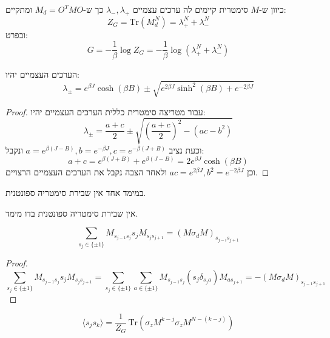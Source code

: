 \documentclass{tstextbook}
\begin{document}
\begin{corollary}
כיוון ש-\(M\) סימטרית קיימים לה ערכים עצמיים \(\lambda_{-},\lambda_{+}\) כך ש-\(M_{d}=O^{T}MO\) ומתקיים:
$$Z_{G}=\mathrm{Tr}(M_{d}^{N})=\lambda_{+}^{N}+\lambda_{-}^{N}$$
ובפרט:
$$G=-{\frac{1}{\beta}}\log Z_{G}=-{\frac{1}{\beta}}\log\left(\lambda_{+}^{N}+\lambda_{-}^{N}\right)$$

\end{corollary}
\begin{proposition}
הערכים העצמיים יהיו:
$$\lambda_{\pm}=e^{\beta J}\cosh(\beta B)\pm\sqrt{e^{2\beta J}\sinh^{2}(\beta B)+e^{-2\beta J}}$$

\end{proposition}
\begin{proof}
עבור מטריצה סימטרית כללית הערכים העצמיים יהיו:
$$\lambda_{\pm}={\frac{a+c}{2}}\pm\sqrt{\left({\frac{a+c}{2}}\right)^{2}-\left(a c-b^{2}\right)}$$
וכעת נציב \(a=e^{ \beta(J-B) },b=e^{ -\beta J },c=e^{ -\beta (J+B) }\) ונקבל:
$$a+c=e^{ \beta(J+B) }+e^{ \beta(J-B) }=2e^{ \beta J }\cosh\left( \beta B \right)$$
וכן \(ac=e^{ 2\beta J },b^{2}=e^{ -2\beta J }\) ולאחר הצבה נקבל את הערכים העצמיים הרצויים.

\end{proof}
\begin{proposition}
במימד אחד אין שבירת סימטריה ספונטנית.

\end{proposition}
\begin{proposition}
אין שבירת סימטריה ספונטנית בדו מימד.

\end{proposition}
\begin{lemma}
$$\sum_{s_{j}\in\{\pm1\}}M_{s_{j-1}s_{j}}s_{j}M_{s_{j}s_{j+1}}=(M\sigma_{d}M)_{s_{j-i}s_{j+1}}$$

\end{lemma}
\begin{proof}
$$\sum_{s_{j}\in\{\pm1\}}M_{s_{j-1}s_{j}}s_{j}M_{s_{j}s_{j+1}}=\sum_{s_{j}\in\{\pm1\}}\sum_{a\in\{\pm1\}}M_{s_{j-1}s_{j}}\left(s_{j}\delta_{s_{j}a}\right)M_{a s_{j+1}}=-\left(M\sigma_{d}M\right)_{s_{j-1}s_{j+1}}$$

\end{proof}
\begin{proposition}
$$\langle s_{j}s_{k}\rangle=\frac{1}{Z_{G}}\,\mathrm{Tr}(\sigma_{z}M^{k-j}\sigma_{z}M^{N-(k-j)})$$

\end{proposition}
\end{document}
